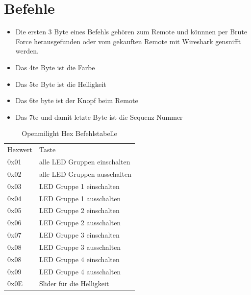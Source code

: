\section{Befehle}
\begin{itemize}
	\item Die ersten 3 Byte eines Befehls gehören zum Remote und könnnen per Brute Force herausgefunden oder vom gekauften Remote mit Wireshark gensnifft werden.
	\item Das 4te Byte ist die Farbe
	\item Das 5te Byte ist die Helligkeit
	\item Das 6te byte ist der Knopf beim Remote
	\item Das 7te und damit letzte Byte ist die Sequenz Nummer
\end{itemize}

\begin{table}[h]
	\centering
	\begin{tabu} to \linewidth {l l}
		\toprule
		Hexwert & Taste \\
		0x01 & alle LED Gruppen einschalten \\
		0x02 & alle LED Gruppen ausschalten \\
		0x03 & LED Gruppe 1 einschalten \\
		0x04 & LED Gruppe 1 ausschalten \\
		0x05 & LED Gruppe 2 einschalten \\
		0x06 & LED Gruppe 2 ausschalten \\
		0x07 & LED Gruppe 3 einschalten \\
		0x08 & LED Gruppe 3 ausschalten \\
		0x08 & LED Gruppe 4 einschalten \\
		0x09 & LED Gruppe 4 ausschalten \\
		0x0E & Slider für die Helligkeit \\
		
		\bottomrule
	\end{tabu}
	\caption{Openmilight Hex Befehlstabelle}
\end{table}




